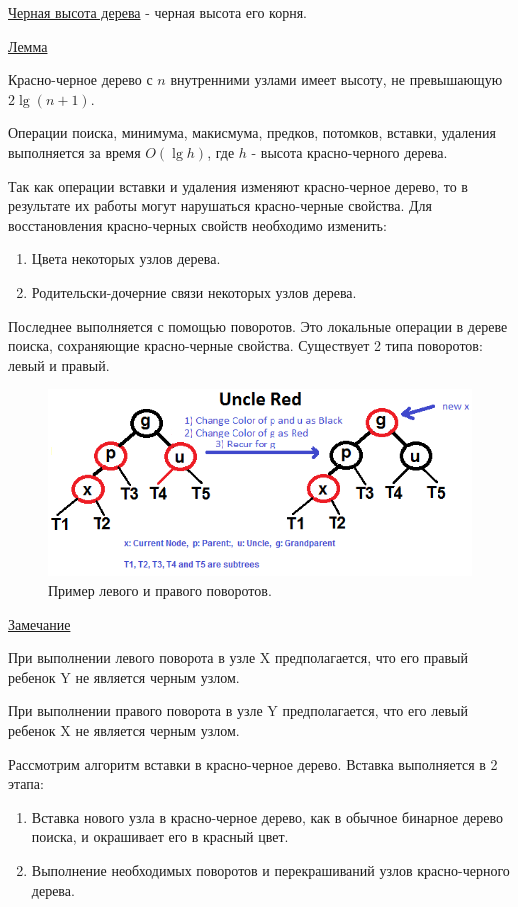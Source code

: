 		\underline{Черная высота дерева} - черная высота его корня.

		\underline{Лемма}

		Красно-черное дерево с $n$ внутренними узлами имеет высоту, не превышающую 
		$2\lg(n+1)$.
	
		Операции поиска, минимума, макисмума, предков, потомков, вставки, удаления выполняется 
		за время $O(\lg h)$, где $h$ - высота красно-черного дерева.

		Так как операции вставки и удаления изменяют красно-черное дерево,
		то в результате их работы могут нарушаться красно-черные свойства. 
		Для восстановления красно-черных свойств необходимо изменить:
		\begin{enumerate}
			\item Цвета некоторых узлов дерева.
			\item Родительски-дочерние связи некоторых узлов дерева.
		\end{enumerate}
		
		Последнее выполняется с помощью поворотов. Это локальные операции в
		дереве поиска, сохраняющие красно-черные свойства.
		Существует 2 типа поворотов: левый и правый.
		
		\begin{figure}[H]
			\centering
			\includegraphics[width=\textwidth]{img/tan-aus.png}
			\caption{\label{fig:tan-aus}Пример левого и правого поворотов.}
		\end{figure}

		\underline{Замечание}

		При выполнении левого поворота в узле X предполагается, что
		его правый ребенок Y не является черным узлом.
	
		При выполнении правого поворота в узле Y предполагается, что
		его левый ребенок X не является черным узлом.

		Рассмотрим алгоритм вставки в красно-черное дерево. Вставка выполняется в 2 этапа:
		\begin{enumerate}
			\item Вставка нового узла в красно-черное дерево, как в обычное бинарное
				  дерево поиска, и окрашивает его в красный цвет.
			\item Выполнение необходимых поворотов и перекрашиваний узлов 
				  красно-черного дерева.
		\end{enumerate}

